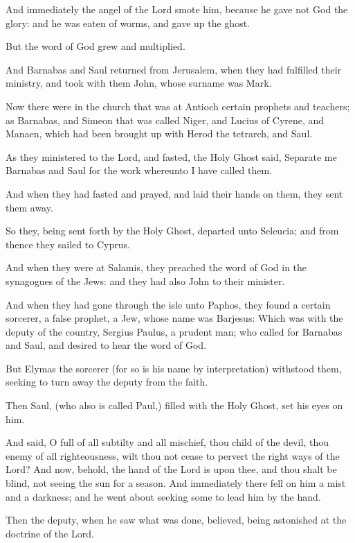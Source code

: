 \Verse And immediately the angel of the Lord smote him, because he gave not God the glory: and he was eaten of worms, and gave up the ghost.

\Verse But the word of God grew and multiplied.

\Verse And Barnabas and Saul returned from Jerusalem, when they had fulfilled their ministry, and took with them John, whose surname was Mark.


\Chapter
\Verse Now there were in the church that was at Antioch certain prophets and teachers; as Barnabas, and Simeon that was called Niger, and Lucius of Cyrene, and Manaen, which had been brought up with Herod the tetrarch, and Saul.

\Verse As they ministered to the Lord, and fasted, the Holy Ghost said, Separate me Barnabas and Saul for the work whereunto I have called them.

\Verse And when they had fasted and prayed, and laid their hands on them, they sent them away.

\Verse So they, being sent forth by the Holy Ghost, departed unto Seleucia; and from thence they sailed to Cyprus.

\Verse And when they were at Salamis, they preached the word of God in the synagogues of the Jews: and they had also John to their minister.

\Verse And when they had gone through the isle unto Paphos, they found a certain sorcerer, a false prophet, a Jew, whose name was Barjesus: \Verse Which was with the deputy of the country, Sergius Paulus, a prudent man; who called for Barnabas and Saul, and desired to hear the word of God.

\Verse But Elymas the sorcerer (for so is his name by interpretation) withstood them, seeking to turn away the deputy from the faith.

\Verse Then Saul, (who also is called Paul,) filled with the Holy Ghost, set his eyes on him.

\Verse And said, O full of all subtilty and all mischief, thou child of the devil, thou enemy of all righteousness, wilt thou not cease to pervert the right ways of the Lord?  \Verse And now, behold, the hand of the Lord is upon thee, and thou shalt be blind, not seeing the sun for a season. And immediately there fell on him a mist and a darkness; and he went about seeking some to lead him by the hand.

\Verse Then the deputy, when he saw what was done, believed, being astonished at the doctrine of the Lord.

